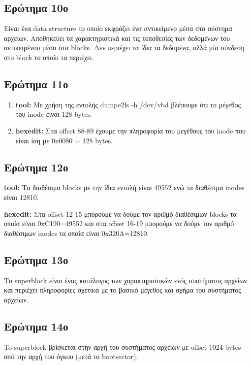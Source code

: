 \documentclass{article}
\begin{document}
\subsection{Ερώτημα 10ο}
Είναι ένα data structure το οποίο εκφράζει ένα αντικείμενο μέσα στο σύστημα αρχείων. Αποθηκεύει 
τα χαρακτηριστικά και τις τοποθεσίες των δεδομένων του αντικειμένου μέσα στα blocks. Δεν περιέχει 
τα ίδια τα δεδομένα, αλλά μία σύνδεση στο block το οποίο τα περιέχει.\\

\subsection{Ερώτημα 11ο}
\begin{enumerate}
    \item{\textbf{tool:} Με χρήση της εντολής dumpe2fs -h /dev/vbd βλέπουμε ότι το μέγεθος του inode 
        είναι 128 bytes.}
    \item{\textbf{hexedit:} Στα offset 88-89 έχουμε την πληροφορία του μεγέθους του inode που είναι ίση με
        0x0080 = 128 bytes.}
\end{enumerate}

\subsection{Ερώτημα 12ο}
    \item{\textbf{tool:} Τα διαθέσιμα blocks με την ίδια εντολή είναι 49552 ενώ τα διαθέσιμα inodes 
        είναι 12810.}
    \item{\textbf{hexedit:} Στα offset 12-15 μπορούμε να δούμε τον αριθμό διαθέσιμων blocks τα οποία 
        είναι 0xC190=49552 και στα offset 16-19 μπορούμε να δούμε τον αριθμό διαθέσιμων inodes τα οποία είναι
    0x320A=12810.}

\subsection{Ερώτημα 13ο}
Το superblock είναι ένας κατάλογος των χαρακτηριστικών ενός συστήματος αρχείων και περιέχει πληροφορίες 
σχετικά με το βασικό μέγεθος και σχήμα του συστήματος αρχείων. \\
\subsection{Ερώτημα 14ο}
To superblock βρίσκεται στην αρχή του συστήματος αρχείων με offset 1024 bytes από την αρχή του όγκου
(μετά το bootsector).\\
\end{document}
